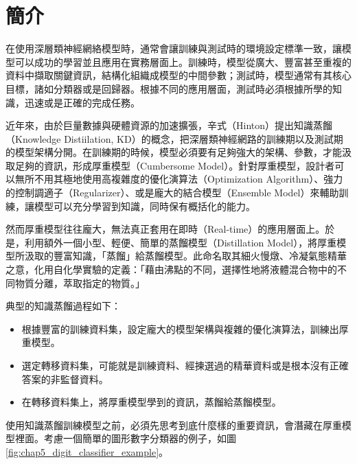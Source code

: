 \section{簡介}
在使用深層類神經網絡模型時，通常會讓訓練與測試時的環境設定標準一致，讓模型可以成功的學習並且應用在實務層面上。訓練時，模型從廣大、豐富甚至重複的資料中擷取關鍵資訊，結構化組織成模型的中間參數；測試時，模型通常有其核心目標，諸如分類器或是回歸器。根據不同的應用層面，測試時必須根據所學的知識，迅速或是正確的完成任務。

近年來，由於巨量數據與硬體資源的加速擴張，辛式（Hinton）提出知識蒸餾（Knowledge Distiilation, KD）的概念，把深層類神經網路的訓練期以及測試期的模型架構分開。在訓練期的時候，模型必須要有足夠強大的架構、參數，才能汲取足夠的資訊，形成厚重模型（Cumbersome Model）。針對厚重模型，設計者可以無所不用其極地使用高複雜度的優化演算法（Optimization Algorithm）、強力的控制調適子（Regularizer）、或是龐大的結合模型（Ensemble Model）來輔助訓練，讓模型可以充分學習到知識，同時保有概括化的能力。

然而厚重模型往往龐大，無法真正套用在即時（Real-time）的應用層面上。於是，利用額外一個小型、輕便、簡單的蒸餾模型（Distillation Model），將厚重模型所汲取的豐富知識，「蒸餾」給蒸餾模型。此命名取其細火慢燉、冷凝氣態精華之意，化用自化學實驗的定義：「藉由沸點的不同，選擇性地將液體混合物中的不同物質分離，萃取指定的物質。」

典型的知識蒸餾過程如下：

\begin{itemize}
\itemsep -2pt
 \item 根據豐富的訓練資料集，設定龐大的模型架構與複雜的優化演算法，訓練出厚重模型。
 \item 選定轉移資料集，可能就是訓練資料、經揀選過的精華資料或是根本沒有正確答案的非監督資料。
 \item 在轉移資料集上，將厚重模型學到的資訊，蒸餾給蒸餾模型。
\end{itemize} 

使用知識蒸餾訓練模型之前，必須先思考到底什麼樣的重要資訊，會潛藏在厚重模型裡面。考慮一個簡單的圖形數字分類器的例子，如圖\ref{fig:chap5_digit_classifier_example}。

